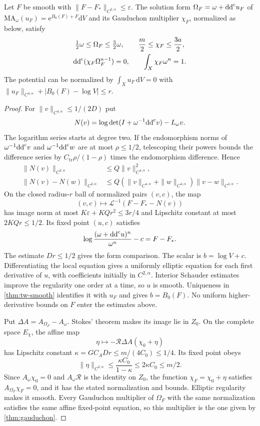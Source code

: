 \begin{lemma}\label{lem:gaud-local-controlled-solution}
Let $F$ be smooth with $\|F-F_*\|_{C^{2,\alpha}}\leq\varepsilon$. The solution form $\Omega_F=\omega+\mathrm{dd}^{\mathrm{c}} u_F$ of $\mathrm{MA}_\omega(u_F)=\mathrm{e}^{B_0(F)+F}\mathrm{d}V$ and its Gauduchon multiplier $\chi_F$, normalized as below, satisfy
\begin{gather*}
 \tfrac12\omega\leq\Omega_F\leq\tfrac32\omega,
 \qquad \frac m2\leq\chi_F\leq\frac{3a}2,\\
 \mathrm{dd}^{\mathrm{c}}(\chi_F\Omega_F^{n-1})=0,
 \qquad \int_X\chi_F\omega^n=1.
\end{gather*}
The potential can be normalized by $\int_Xu_F\,\mathrm{d}V=0$ with
$\|u_F\|_{C^{4,\alpha}}+|B_0(F)-\log V|\leq r$.
\end{lemma}
\begin{proof}
For $\|v\|_{C^{4,\alpha}}\leq1/(2D)$ put
\[
 N(v)=\log\det(I+\omega^{-1}\mathrm{dd}^{\mathrm{c}} v)-L_\omega v.
\]
The logarithm series starts at degree two. If the endomorphism norms of $\omega^{-1}\mathrm{dd}^{\mathrm{c}} v$ and $\omega^{-1}\mathrm{dd}^{\mathrm{c}} w$ are at most $\rho\leq1/2$, telescoping their powers bounds the difference series by $C_{\mathrm{tr}}\rho/(1-\rho)$ times the endomorphism difference. Hence
\begin{align*}
 \|N(v)\|_{C^{2,\alpha}}&\leq Q\|v\|_{C^{4,\alpha}}^2,\\
 \|N(v)-N(w)\|_{C^{2,\alpha}}
 &\leq Q(\|v\|_{C^{4,\alpha}}+\|w\|_{C^{4,\alpha}})
                                      \|v-w\|_{C^{4,\alpha}}.
\end{align*}
On the closed radius-$r$ ball of normalized pairs $(v,c)$, the map
\[
 (v,c)\longmapsto\mathcal L^{-1}(F-F_*-N(v))
\]
has image norm at most $K\varepsilon+KQr^2\leq3r/4$ and Lipschitz constant at most $2KQr\leq1/2$. Its fixed point $(u,c)$ satisfies
\[
 \log\frac{(\omega+\mathrm{dd}^{\mathrm{c}} u)^n}{\omega^n}-c=F-F_*.
\]
The estimate $Dr\leq1/2$ gives the form comparison. The scalar is $b=\log V+c$. Differentiating the local equation gives a uniformly elliptic equation for each first derivative of $u$, with coefficients initially in $C^{2,\alpha}$. Interior Schauder estimates improve the regularity one order at a time, so $u$ is smooth. Uniqueness in \cref{thm:tw-smooth} identifies it with $u_F$ and gives $b=B_0(F)$. No uniform higher-derivative bounds on $F$ enter the estimates above.

Put $\Delta A=A_{\Omega_F}-A_\omega$. Stokes' theorem makes its image lie in $Z_0$. On the complete space $E_\chi$, the affine map
\[
 \eta\longmapsto-\mathcal R\Delta A(\chi_0+\eta)
\]
has Lipschitz constant
$\kappa=GC_ADr\leq m/(4C_0)\leq1/4$. Its fixed point obeys
\[
 \|\eta\|_{C^{2,\alpha}}
       \leq\frac{\kappa C_0}{1-\kappa}
       \leq2\kappa C_0\leq m/2.
\]
Since $A_\omega\chi_0=0$ and $A_\omega\mathcal R$ is the identity on $Z_0$, the function $\chi_F=\chi_0+\eta$ satisfies $A_{\Omega_F}\chi_F=0$, and it has the stated normalization and bounds. Elliptic regularity makes it smooth. Every Gauduchon multiplier of $\Omega_F$ with the same normalization satisfies the same affine fixed-point equation, so this multiplier is the one given by \cref{thm:gauduchon}.
\end{proof}

